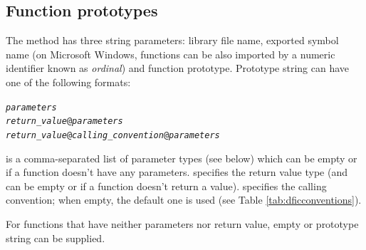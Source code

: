 \documentclass[a4paper,12pt,twoside,extrafontsizes]{memoir}
\begin{document}
\subsection{Function prototypes}
\label{subsec:dficprototypes}

The  method has three string parameters: library file name, exported symbol name (on Microsoft Windows, functions can be also imported by a numeric identifier known as \emph{ordinal}) and function prototype. Prototype string can have one of the following formats:

\begin{alltt}
\emph{parameters}
\emph{return\_value}@\emph{parameters}
\emph{return\_value}@\emph{calling\_convention}@\emph{parameters}
\end{alltt}

 is a comma-separated list of parameter types (see below) which can be empty or  if a function doesn't have any parameters.  specifies the return value type (and can be empty or  if a function doesn't return a value).  specifies the calling convention; when empty, the default one is used (see Table \ref{tab:dficconventions}).

For functions that have neither parameters nor return value, empty or  prototype string can be supplied.
\end{document}
